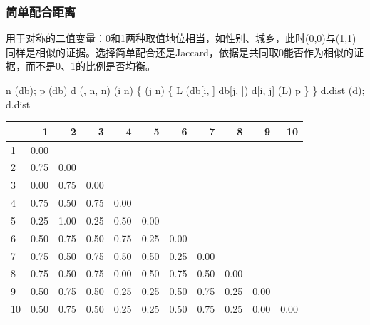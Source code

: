\subsubsection{简单配合距离}
用于对称的二值变量：0和1两种取值地位相当，如性别、城乡，此时(0,0)与(1,1)同样是相似的证据。选择简单配合还是Jaccard，依据是共同取0能否作为相似的证据，而不是0、1的比例是否均衡。
\begin{code}
n \ROperator{<-} (db); p \ROperator{<-} (db)
d \ROperator{<-} (, n, n)
 (i  \ROperator{:}n) \{
   (j  \ROperator{:}n) \{
    L \ROperator{<-} (db[i, ] \ROperator{==} db[j, ])
    d[i, j] \ROperator{<-}  \ROperator{-} (L) \ROperator{/} p
  \}
\}
d.dist \ROperator{<-} (d); d.dist
\end{code}
\par\addvspace{5pt}\begin{center}\begin{minipage}{\linewidth}\centering
\small
{}
\begin{tabular}{lrrrrrrrrrr}\toprule
 &{\bfseries  1 }&{\bfseries  2 }&{\bfseries  3 }&{\bfseries  4 }&{\bfseries  5 }&{\bfseries  6 }&{\bfseries  7 }&{\bfseries  8 }&{\bfseries  9 }&{\bfseries  10}\\\midrule
1 & 0.00 &  &  &  &  &  &  &  &  & \\
2 & 0.75 & 0.00 &  &  &  &  &  &  &  & \\
3 & 0.00 & 0.75 & 0.00 &  &  &  &  &  &  & \\
4 & 0.75 & 0.50 & 0.75 & 0.00 &  &  &  &  &  & \\
5 & 0.25 & 1.00 & 0.25 & 0.50 & 0.00 &  &  &  &  & \\
6 & 0.50 & 0.75 & 0.50 & 0.75 & 0.25 & 0.00 &  &  &  & \\
7 & 0.75 & 0.50 & 0.75 & 0.50 & 0.50 & 0.25 & 0.00 &  &  & \\
8 & 0.75 & 0.50 & 0.75 & 0.00 & 0.50 & 0.75 & 0.50 & 0.00 &  & \\
9 & 0.50 & 0.75 & 0.50 & 0.25 & 0.25 & 0.50 & 0.75 & 0.25 & 0.00 & \\
10 & 0.50 & 0.75 & 0.50 & 0.25 & 0.25 & 0.50 & 0.75 & 0.25 & 0.00 & 0.00\\
\bottomrule\end{tabular}
\end{minipage}\end{center}


